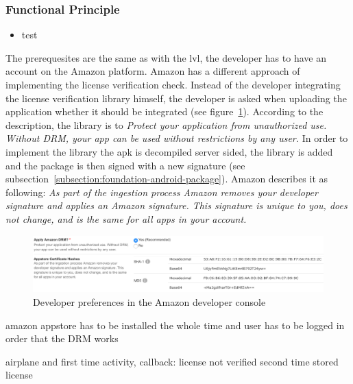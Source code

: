 \subsubsection{Functional Principle}\label{section:license-amazon-functional}
\begin{itemize}
    \item test
\end{itemize}
The prerequesites are the same as with the \gls{lvl}, the developer has to have an account on the Amazon platform.
Amazon has a different approach of implementing the license verification check.
Instead of the developer integrating the license verification library himself, the developer is asked when uploading the application whether it should be integrated (see figure~\ref{fig:amazon}).
According to the description, the library is to \textit{Protect your application from unauthorized use. Without DRM, your app can be used without restrictions by any user.} \cite{amazonDeveloper}
In order to implement the library the \gls{apk} is decompiled server sided, the library is added and the package is then signed with a new signature (see subsection~\ref{subsection:foundation-android-package}).
Amazon describes it as following: \textit{As part of the ingestion process Amazon removes your developer signature and applies an Amazon signature. This signature is unique to you, does not change, and is the same for all apps in your account.} \cite{amazonDeveloper}

\begin{figure}[h]
    \centering
    \includegraphics[width=1\textwidth]{data/amazon.png}
    \caption{Developer preferences in the Amazon developer console \cite{amazonDeveloper}}
    \label{fig:amazon}
\end{figure}




amazon appstore has to be installed the whole time and user has to be logged in order that the DRM works

airplane and first time
activity, callback: license not verified
second time
stored license
